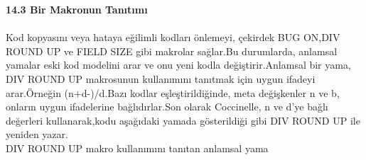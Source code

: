 \documentclass[24pt]{article}
\begin{document}
\textbf{14.3 Bir Makronun Tanıtımı}\\
\\
Kod kopyasını veya hataya eğilimli kodları önlemeyi, çekirdek BUG ON,DIV ROUND UP ve FIELD SIZE gibi makrolar sağlar.Bu durumlarda, anlamsal yamalar eski kod modelini arar ve onu yeni kodla değiştirir.Anlamsal bir yama, DIV ROUND UP makrosunun kullanımını tanıtmak için uygun ifadeyi arar.Örneğin (n+d-)/d.Bazı kodlar eşleştirildiğinde, meta değişkenler n ve b, onların uygun ifadelerine bağlıdırlar.Son olarak Coccinelle, n ve d'ye bağlı değerleri kullanarak,kodu aşağıdaki yamada gösterildiği gibi DIV ROUND UP ile yeniden yazar.\\

DIV ROUND UP makro kullanımını tanıtan anlamsal yama\\
\end{document}
